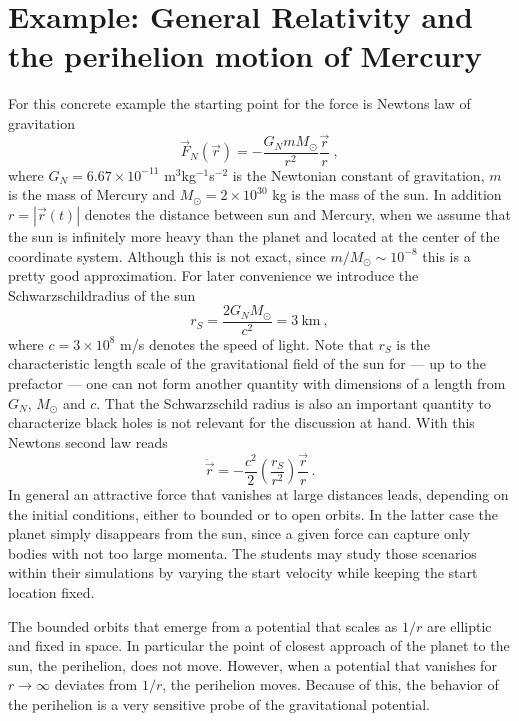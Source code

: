 \documentclass[12pt,ngerman,american]{iopart}
\begin{document}
\section{Example: General Relativity and the perihelion motion of Mercury}\label{sec:gr}
For this concrete example the starting point for the force is Newtons law of gravitation
\begin{equation}
\vec F_N(\vec r) = - \frac{G_N m M_\odot}{r^2} \frac{\vec r}{r}\ ,
\end{equation}
where $G_N=6.67\times 10^{-11}$ m$^3$kg$^{-1}$s$^{-2}$ is the Newtonian constant of gravitation, $m$ is the mass of Mercury and $M_\odot=2\times 10^{30}$ kg is the mass of the sun.
In addition $r=|\vec r(t)|$ denotes the distance between sun and Mercury, when we assume that the sun is infinitely more heavy than the planet and located at the center of the coordinate system.
Although this is not exact, since $m/M_\odot\sim 10^{-8}$ this is a pretty good approximation.
For later convenience we introduce the Schwarzschildradius of the sun
\begin{equation}
r_S=\frac{2G_N  M_\odot}{c^2} = 3 \ \mbox{km} \ ,
\label{rsdef}
\end{equation}
where $c=3\times 10^8$ m/s denotes the speed of light.
Note that $r_S$ is the characteristic length scale of the gravitational field of the sun for --- up to the prefactor --- one can not form another quantity with dimensions of a length from $G_N$, $M_\odot$ and $c$.
That the Schwarzschild radius is also an important quantity to characterize black holes is not relevant for the discussion at hand.
With this Newtons second law reads
\begin{equation}
	\ddot{\vec r}      = - \frac{c^2}{2}\left(\frac{r_S}{r^2}\right)\frac{\vec r}{r} \, .
\label{eq:newton}
\end{equation}
In general an attractive force that vanishes at large distances leads,  depending on the initial conditions, either to bounded or to open orbits.
In the latter case the planet simply disappears from the sun, since a given force can capture only bodies with not too large momenta.
The students may study those scenarios within their simulations  by varying the start velocity while keeping the start location fixed.

The bounded orbits that emerge from a potential that scales as $1/r$ are elliptic and fixed in space.
In particular the point of closest approach of the planet to the sun, the perihelion, does not move.
However, when a potential that vanishes for $r\to \infty$ deviates from $1/r$, the perihelion moves.
Because of this, the behavior of the perihelion is a very sensitive probe of the gravitational potential.
\end{document}
